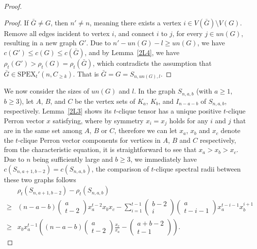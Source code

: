 \documentclass[preprint,12pt]{elsarticle}
\begin{document}
\begin{proof}
            \begin{proof}
                If $\bar{G} \neq G$, then $n' \neq n$, meaning there exists a vertex $i \in V(\bar{G}) \setminus V(G)$. Remove all edges incident to vertex $i$, and connect $i$ to $j$, for every $j \in un(G)$, resulting in a new graph $G'$. Due to $n'-un(G)-l \geq un(G) $, we have $c(G') \leq c(G) \leq c(\bar{G})$, and by Lemma~\ref{2L4}, we have $\rho_t(G') > \rho_t(G) = \rho_t(\bar{G})$, which contradicts the assumption that $\bar{G} \in \mathrm{SPEX}_t'(n, C_{\geq k})$. That is $\bar{G} = G = S_{n,{un}(G),l}$.
            \end{proof}




             We now consider the sizes of $un(G)$ and $l$. In the graph $S_{n, a, b}$ (with $a \geq 1$, $b \geq 3$), let $A$, $B$, and $C$ be the vertex sets of $K_a$, $K_b$, and $I_{n-a-b}$ of $S_{n,a,b}$, respectively. Lemma~\ref{2L3} shows its $t$-clique tensor has a unique positive $t$-clique Perron vector $x $ satisfying, where by symmetry $x_i=x_j $ holds for any $i$ and $j$ that are in the same set among $A $, $B $ or $C $, therefore we can let $x_a $, $x_b $ and $x_c $ denote the $t$-clique Perron vector components for vertices in $A$, $B$ and $C$ respectively, from the characteristic equation, it is straightforward to see that $x_a > x_b > x_c$.
             Due to $n $ being sufficiently large and $b \geq 3 $, we immediately have $c(S_{n,a+1,b-2}) = c(S_{n,a,b}) $, the comparison of $t$-clique spectral radii between these two graphs follows
                \begin{align*}
                    &\rho_t(S_{n,a+1,b-2})-\rho_t(S_{n,a,b})
                    \\\geq & (n-a-b)\begin{pmatrix} a\\t-2 \end{pmatrix}x_a^{t-2}x_bx_c-\sum_{i=1}^{t-1}\begin{pmatrix} b-2\\i \end{pmatrix}\begin{pmatrix} a\\t-i-1 \end{pmatrix}x_a^{t-i-1}x_b^{i+1}
                    \\\geq & x_bx_a^{t-1}\left((n-a-b)\begin{pmatrix} a\\t-2 \end{pmatrix}\frac{x_c}{x_a}-\begin{pmatrix} a+b-2\\t-1 \end{pmatrix} \right).

\end{align*}
\end{proof}
\end{document}
